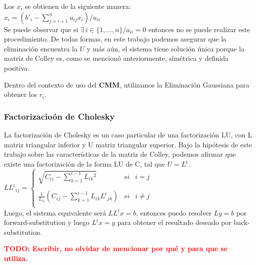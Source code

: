 Los $x{_i}$ se obtienen de la siguiente manera: \\

$x{_i} = (b'{_i} - \sum\limits_{j = i + 1}^n u_{ij}x_{i}) / u_{ii}$ \\

Se puede observar que si $\exists \, i \in \{1, ..., n\} / a_{ii} = 0$ entonces no se puede realizar este procedimiento. De todas formas, en este trabajo podemos asegurar que la eliminaci\'on encuentra la $U$ y m\'as a\'un, el sistema tiene soluci\'on \'unica porque la matriz de Colley es, como se mencion\'o anteriormente, sim\'etrica y definida positiva.

Dentro del contexto de uso del \textbf{CMM}, utilizamos la Eliminaci\'on Gaussiana para obtener los $r_i$.

\subsubsection{Factorizacio\'on de Cholesky}

La factorizaci\'on de Cholesky es un caso particular de una factorizaci\'on LU, con L matriz triangular inferior y U matriz triangular superior. Bajo la hip\'otesis de este trabajo sobre las caracter\'isticas de la matriz de Colley, podemos afirmar que existe una factorizaci\'on de la forma LU de C, tal que $U = L{^t}$. \\

$LL{^t}{_i}{_j} =
\left\{
	\begin{array}{lcc}
		\sqrt{C{_i}{_i} - \sum\limits_{k=1}^{i-1} L{_i}{_k}^2} & si & i = j \\
		\\ \frac{1}{L{_i}{_i}}(C{_i}{_j} - \sum\limits_{k=1}^{i-1} L{_i}{_k}L{^t}{_j}{_k}) & si & i \neq j \\
	\end{array}
\right.$ \\

Luego, el sistema equivalente ser\'a $LL{^t}x = b$, entonces puedo resolver $Ly = b$ por forward-substitution y luego $L{^t}x = y$ para obtener el resultado deseado por back-substitution.

\textcolor{red}{\textbf{TODO: Escribir, no olvidar de mencionar por qu\'e y para que se utiliza.}}